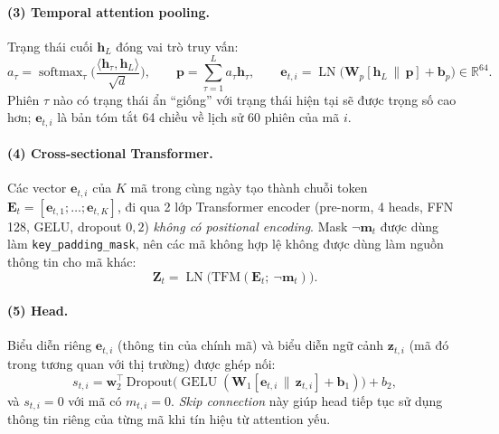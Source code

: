 \documentclass[a4paper,12pt]{article}
\DeclareMathOperator{\softmax}{softmax}
\DeclareMathOperator{\GELU}{GELU}
\DeclareMathOperator{\LN}{LN}
\begin{document}
\paragraph{(3) Temporal attention pooling.} Trạng thái cuối $\mathbf{h}_L$ đóng vai trò truy vấn:
\begin{equation}
    a_\tau=\softmax_\tau\!\Big(\frac{\langle\mathbf{h}_\tau,\mathbf{h}_L\rangle}{\sqrt{d}}\Big),\qquad
    \mathbf{p}=\sum_{\tau=1}^{L}a_\tau\mathbf{h}_\tau,\qquad
    \mathbf{e}_{t,i}=\LN\big(\mathbf{W}_p[\mathbf{h}_L\,\|\,\mathbf{p}]+\mathbf{b}_p\big)\in\mathbb{R}^{64}.
\end{equation}
Phiên $\tau$ nào có trạng thái ẩn ``giống'' với trạng thái hiện tại sẽ được trọng số cao hơn; $\mathbf{e}_{t,i}$ là bản tóm tắt 64 chiều về lịch sử 60 phiên của mã $i$.

\paragraph{(4) Cross-sectional Transformer.} Các vector $\mathbf{e}_{t,i}$ của $K$ mã trong cùng ngày tạo thành chuỗi token $\mathbf{E}_t=[\mathbf{e}_{t,1};\dots;\mathbf{e}_{t,K}]$, đi qua 2 lớp Transformer encoder (pre-norm, 4 heads, FFN 128, GELU, dropout $0{,}2$) \emph{không có positional encoding}. Mask $\neg\mathbf{m}_t$ được dùng làm \texttt{key\_padding\_mask}, nên các mã không hợp lệ không được dùng làm nguồn thông tin cho mã khác:
\begin{equation}
    \mathbf{Z}_t=\LN\big(\mathrm{TFM}(\mathbf{E}_t;\ \neg\mathbf{m}_t)\big).
\end{equation}

\paragraph{(5) Head.} Biểu diễn riêng $\mathbf{e}_{t,i}$ (thông tin của chính mã) và biểu diễn ngữ cảnh $\mathbf{z}_{t,i}$ (mã đó trong tương quan với thị trường) được ghép nối:
\begin{equation}
    s_{t,i}=\mathbf{w}_2^\top\,\mathrm{Dropout}\big(\GELU(\mathbf{W}_1[\mathbf{e}_{t,i}\,\|\,\mathbf{z}_{t,i}]+\mathbf{b}_1)\big)+b_2,
\end{equation}
và $s_{t,i}=0$ với mã có $m_{t,i}=0$. \textit{Skip connection} này giúp head tiếp tục sử dụng thông tin riêng của từng mã khi tín hiệu từ attention yếu.
\end{document}
